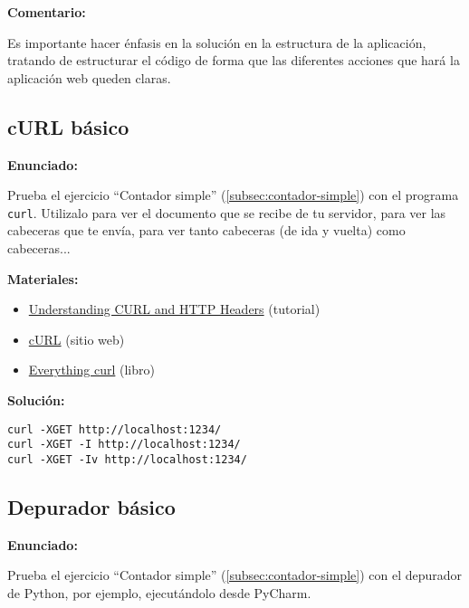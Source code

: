 \textbf{Comentario:}

Es importante hacer énfasis en la solución en la estructura de la aplicación, tratando de estructurar el código de forma que las diferentes acciones que hará la aplicación web queden claras.

\subsection{cURL básico}
\label{subsec:curl-basico}

\textbf{Enunciado:}

Prueba el ejercicio ``Contador simple'' (\ref{subsec:contador-simple}) con el programa \verb|curl|. Utilizalo para ver el documento que se recibe de tu servidor, para ver las cabeceras que te envía, para ver tanto cabeceras (de ida y vuelta) como cabeceras...

\textbf{Materiales:}

\begin{itemize}
\item \href{https://linuxacademy.com/guide/13852-understanding-curl-and-http-headers/}{Understanding CURL and HTTP Headers} (tutorial)
\item \href{https://curl.haxx.se/}{cURL} (sitio web)
\item \href{https://curl.haxx.se/book.html}{Everything curl} (libro)
\end{itemize}

\textbf{Solución:}

\begin{verbatim}
curl -XGET http://localhost:1234/
curl -XGET -I http://localhost:1234/
curl -XGET -Iv http://localhost:1234/
\end{verbatim}


\subsection{Depurador básico}
\label{subsec:depurador-basico}

\textbf{Enunciado:}

Prueba el ejercicio ``Contador simple'' (\ref{subsec:contador-simple}) con el depurador de Python, por ejemplo, ejecutándolo desde PyCharm.


